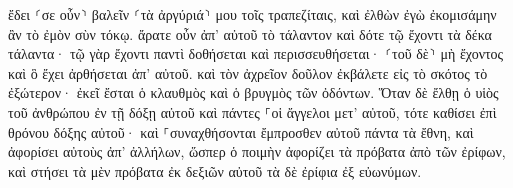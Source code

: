 \documentclass{openreader}
\begin{document}
ἔδει ⸂σε οὖν⸃ βαλεῖν ⸂τὰ ἀργύριά⸃ μου τοῖς τραπεζίταις, καὶ ἐλθὼν ἐγὼ ἐκομισάμην ἂν τὸ ἐμὸν σὺν τόκῳ. 
ἄρατε οὖν ἀπ’ αὐτοῦ τὸ τάλαντον καὶ δότε τῷ ἔχοντι τὰ δέκα τάλαντα· 
τῷ γὰρ ἔχοντι παντὶ δοθήσεται καὶ περισσευθήσεται· ⸂τοῦ δὲ⸃ μὴ ἔχοντος καὶ ὃ ἔχει ἀρθήσεται ἀπ’ αὐτοῦ. 
καὶ τὸν ἀχρεῖον δοῦλον ἐκβάλετε εἰς τὸ σκότος τὸ ἐξώτερον· ἐκεῖ ἔσται ὁ κλαυθμὸς καὶ ὁ βρυγμὸς τῶν ὀδόντων. 
Ὅταν δὲ ἔλθῃ ὁ υἱὸς τοῦ ἀνθρώπου ἐν τῇ δόξῃ αὐτοῦ καὶ πάντες ⸀οἱ ἄγγελοι μετ’ αὐτοῦ, τότε καθίσει ἐπὶ θρόνου δόξης αὐτοῦ· 
καὶ ⸀συναχθήσονται ἔμπροσθεν αὐτοῦ πάντα τὰ ἔθνη, καὶ ἀφορίσει αὐτοὺς ἀπ’ ἀλλήλων, ὥσπερ ὁ ποιμὴν ἀφορίζει τὰ πρόβατα ἀπὸ τῶν ἐρίφων, 
καὶ στήσει τὰ μὲν πρόβατα ἐκ δεξιῶν αὐτοῦ τὰ δὲ ἐρίφια ἐξ εὐωνύμων. 
\end{document}

